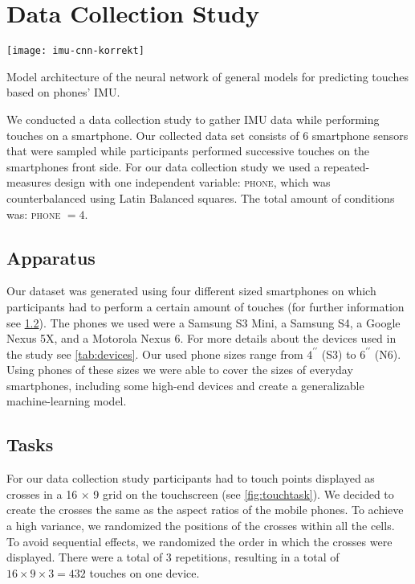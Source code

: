 \section{Data Collection Study}
\begin{marginfigure}
	\vspace{-0.5cm}
	\texttt{[image: imu-cnn-korrekt]}
	\caption[Model architecture]{Model architecture of the neural network of general models for predicting touches based on phones' IMU.}
	\label{fig:model_architecture}
\end{marginfigure}


We conducted a data collection study to gather IMU data while performing touches on a smartphone.
Our collected data set consists of 6 smartphone sensors that were sampled while participants performed successive touches on the smartphones front side. 
For our data collection study we used a repeated-measures design with one independent variable: \textsc{phone}, which was counterbalanced using Latin Balanced squares. 
The total amount of conditions was: \textsc{phone} $ = 4$.

\subsection{Apparatus}
Our dataset was generated using four different sized smartphones on which participants had to perform a certain amount of touches (for further information see \cref{sec:tasks}).
The phones we used were a Samsung S3 Mini, a Samsung S4, a Google Nexus 5X, and a Motorola Nexus 6.
For more details about the devices used in the study see \cref{tab:devices}.
Our used phone sizes range from $ 4^{\prime\prime} $ (S3) to $ 6^{\prime\prime} $ (N6). 
Using phones of these sizes we were able to cover the sizes of everyday smartphones, including some high-end devices and create a generalizable machine-learning model.



\subsection{Tasks}
\label{sec:tasks}

For our data collection study participants had to touch points displayed as crosses in a 16 $ \times $ 9 grid on the touchscreen (see \cref{fig:touchtask}). 
We decided to create the crosses the same as the aspect ratios of the mobile phones.
To achieve a high variance, we randomized the positions of the crosses within all the cells.
To avoid sequential effects, we randomized the order in which the crosses were displayed.
There were a total of 3 repetitions, resulting in a total  of $ 16 \times 9 \times 3 = 432 $ touches on one device.

